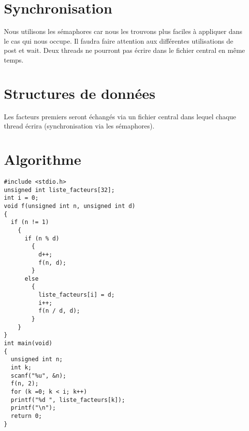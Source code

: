 \documentclass[11pt,a4paper]{article}
\begin{document}
\section{Synchronisation}
Nous utilisons les sémaphores car nous les trouvons plus faciles à appliquer dans le cas qui nous occupe. Il faudra faire attention aux différentes utilisations de post et wait. Deux threads ne pourront pas écrire dans le fichier central en même temps.
\section{Structures de données}
Les facteurs premiers seront échangés via un fichier central dans lequel chaque thread écrira (synchronisation via les sémaphores). 
\section{Algorithme}
\begin{lstlisting}
#include <stdio.h>
unsigned int liste_facteurs[32];
int i = 0;
void f(unsigned int n, unsigned int d)
{
  if (n != 1)
    {
      if (n % d)
        {
          d++;
          f(n, d);
        }
      else
        {
          liste_facteurs[i] = d;
          i++;
          f(n / d, d);
        }
    }
}
int main(void)
{
  unsigned int n;
  int k;
  scanf("%u", &n);
  f(n, 2);
  for (k =0; k < i; k++)
  printf("%d ", liste_facteurs[k]);
  printf("\n");
  return 0;
}
\end{lstlisting}
\end{document}
